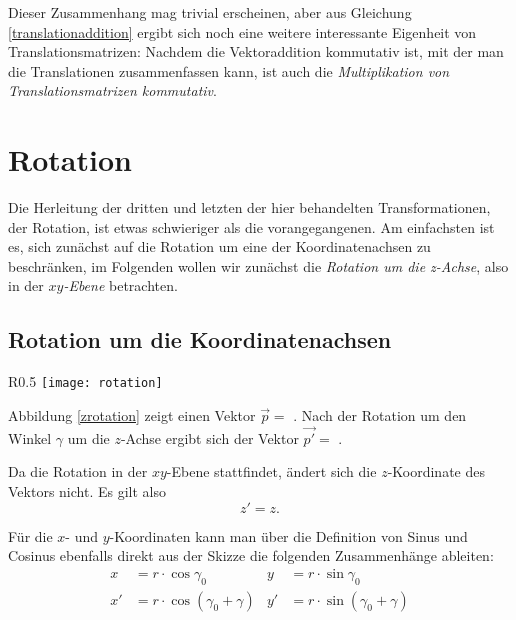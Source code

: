 Dieser Zusammenhang mag trivial erscheinen, aber aus Gleichung \ref{translationaddition} ergibt sich noch eine weitere interessante Eigenheit von Translationsmatrizen: Nachdem die Vektoraddition kommutativ ist, mit der man die Translationen zusammenfassen kann, ist auch die \emph{Multiplikation von Translationsmatrizen kommutativ}.

\section{Rotation}
Die Herleitung der dritten und letzten der hier behandelten Transformationen, der Rotation, ist etwas schwieriger als die vorangegangenen. Am einfachsten ist es, sich zunächst auf die Rotation um eine der Koordinatenachsen zu beschränken, im Folgenden wollen wir zunächst die \emph{Rotation um die z-Achse}, also in der \emph{$xy$-Ebene} betrachten.

\subsection{Rotation um die Koordinatenachsen}

\begin{wrapfigure}{R}{0.5\textwidth}
  \vspace{-15pt}
  \texttt{[image: rotation]}
  \vspace{-15pt}
  \caption{Rotation um die $z$-Achse.}
  \label{zrotation}
\end{wrapfigure}

Abbildung \ref{zrotation} zeigt einen Vektor $\vec p = $ . Nach der Rotation um den Winkel $\gamma$ um die $z$-Achse ergibt sich der Vektor $\vec{p'} = $ .

Da die Rotation in der $xy$-Ebene stattfindet, ändert sich die $z$-Koordinate des Vektors nicht. Es gilt also
\begin{equation}
 z' = z.
\end{equation}

Für die $x$- und $y$-Koordinaten kann man über die Definition von Sinus und Cosinus ebenfalls direkt aus der Skizze die folgenden Zusammenhänge ableiten:
\begin{align}
  x &= r \cdot \cos{\gamma_0}            &   y &= r \cdot \sin{\gamma_0} \label{rot1} \\
 x' &= r \cdot \cos{(\gamma_0 + \gamma)} &  y' &= r \cdot \sin{(\gamma_0 + \gamma)} \label{rot2}
\end{align}

